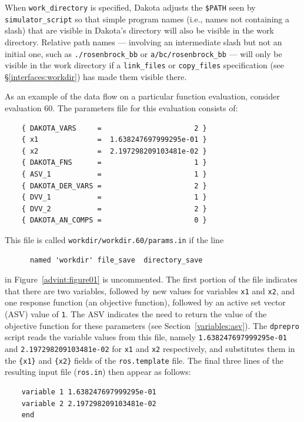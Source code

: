 When \texttt{work\_directory} is specified, Dakota adjusts the \texttt{\$PATH} seen
by \texttt{simulator\_script} so that simple program names
(i.e., names not containing a slash) that
are visible in Dakota's directory will also be visible in the work directory.
Relative path names ---
involving an intermediate slash but not an initial one,
such as \texttt{./rosenbrock\_bb} or \texttt{a/bc/rosenbrock\_bb} ---
will only be visible in the work directory if a \texttt{link\_files}
or \texttt{copy\_files} specification (see \S\ref{interfaces:workdir})
has made them visible there.

As an example of the data flow on a particular function evaluation,
consider evaluation 60. The parameters file for this evaluation consists of:
\begin{small}
\begin{verbatim}
    { DAKOTA_VARS     =                      2 }
    { x1              =  1.638247697999295e-01 }
    { x2              =  2.197298209103481e-02 }
    { DAKOTA_FNS      =                      1 }
    { ASV_1           =                      1 }
    { DAKOTA_DER_VARS =                      2 }
    { DVV_1           =                      1 }
    { DVV_2           =                      2 }
    { DAKOTA_AN_COMPS =                      0 }
\end{verbatim}
\end{small}

This file is called \texttt{workdir/workdir.60/params.in} if the line
\begin{small}
\begin{verbatim}
 	  named 'workdir' file_save  directory_save
\end{verbatim}
\end{small}
in Figure~\ref{advint:figure01} is uncommented.
The first portion of the file indicates that there are two variables,
followed by new values for variables \texttt{x1} and \texttt{x2}, and
one response function (an objective function), followed by an active
set vector (ASV) value of \texttt{1}. The ASV indicates the need to
return the value of the objective function for these parameters (see
Section~\ref{variables:asv}). The \texttt{dprepro} script reads the
variable values from this file, namely \texttt{1.638247697999295e-01}
and \texttt{2.197298209103481e-02} for \texttt{x1} and \texttt{x2}
respectively, and substitutes them in the \texttt{\{x1\}} and
\texttt{\{x2\}} fields of the \texttt{ros.template} file. The final
three lines of the resulting input file (\texttt{ros.in}) then appear
as follows:
\begin{small}
\begin{verbatim}
    variable 1 1.638247697999295e-01
    variable 2 2.197298209103481e-02
    end
\end{verbatim}
\end{small}

